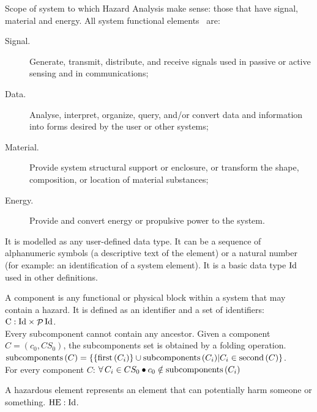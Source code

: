 Scope of system to which Hazard Analysis make sense: those that have signal, material and energy.
%
All system functional elements~\cite[p. 47]{KSS+2011} are:
\begin{description}
  \item[Signal.] Generate, transmit, distribute, and receive signals used in passive or active sensing and in communications;
  \item[Data.]Analyse, interpret, organize, query, and/or convert data and information into forms desired by the user or other systems;
  \item[Material.] Provide system structural support or enclosure, or transform the shape, composition, or location of material substances;
  \item[Energy.] Provide and convert energy or propulsive power to the system.
\end{description}

\begin{definition}[Identifier]
It is modelled as any user-defined data type. It can be a sequence of alphanumeric symbols (a descriptive text of the element) or a natural number (for example: an identification of a system element). It is a basic data type $\mathrm{Id}$ used in other definitions.
\end{definition}

\begin{definition}[Component]
A component is any functional or physical block within a system that may contain a hazard. 
%
It is defined as an identifier and a set of identifiers: 
%
\\$\mathrm{C}: \mathrm{Id}\times\mathop{\mathcal{P}} \mathrm{Id}$.
%
\\Every subcomponent cannot contain any ancestor.
%
Given a component $C=\left(c_0,CS_0\right)$, the subcomponents set is obtained by a folding operation.
%
\\$\mathop{\mathrm{subcomponents}\left(C\right)} = \left\{ \left\{\mathop{\mathrm{first}}\left(C_i\right)\right\} \cup \mathop{\mathrm{subcomponents}\left(C_i\right)} \middle| C_i \in \mathop{\mathrm{second}}\left(C\right)\right\}$.
%
\\For every component $C$: $\hmforall{C_i \in CS_0}{c_0 \notin \hmsubcomponents{C_i}}$ 
\end{definition}

\begin{definition}
A hazardous element represents an element that can potentially harm someone or something.
$\mathrm{HE}: \mathrm{Id}$.
\end{definition}

